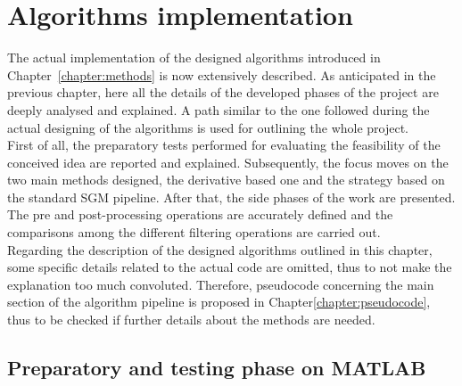 \chapter{Algorithms implementation}
\label{chapter:implementation}

The actual implementation of the designed algorithms introduced in Chapter~\ref{chapter:methods} is now extensively described. 
As anticipated in the previous chapter, here all the details of the developed phases of the project are deeply analysed and explained. 
A path similar to the one followed during the actual designing of the algorithms is used for outlining the whole project.\\
First of all, the preparatory tests performed for evaluating the feasibility of the conceived idea are reported and explained. 
Subsequently, the focus moves on the two main methods designed, the derivative based one and the strategy based on the standard SGM pipeline.
After that, the side phases of the work are presented. 
The pre and post-processing operations are accurately defined and the comparisons among the different filtering operations are carried out.\\
Regarding the description of the designed algorithms outlined in this chapter, some specific details related to the actual code are omitted, thus to not make the explanation too much convoluted.
Therefore, pseudocode concerning the main section of the algorithm pipeline is proposed in Chapter\ref{chapter:pseudocode}, thus to be checked if further details about the methods are needed.

\section{Preparatory and testing phase on MATLAB}
\label{section:prep-pahse-matlab}

